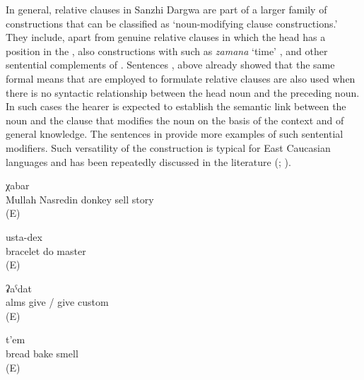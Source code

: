 In general, relative clauses in Sanzhi Dargwa are part of a larger family of constructions that can be classified as `noun-modifying clause constructions.' They include, apart from genuine relative clauses in which the head has a position in the , also constructions with   such as \textit{zamana} `time' ,  and other sentential complements of . Sentences ,  above already showed that the same formal means that are employed to formulate relative clauses are also used when there is no syntactic relationship between the head noun and the preceding noun. In such cases the hearer is expected to establish the semantic link between the noun and the clause that modifies the noun on the basis of the context and of general knowledge. The sentences in  provide more examples of such sentential modifiers. Such versatility of the  construction is typical for East Caucasian languages and has been repeatedly discussed in the literature (\citealp{Daniel.Lander2008, Daniel.Lander2010}; \citealp{Comrie.Forker.Khalilova2017}).

\begin{exe}
	\ex	\label{ex:the story that Mulla Nasredin sold a donkey}
		χabar\\
		Mullah	Nasredin	donkey	sell	story\\
	\glt	{} (E)

	\ex	\label{ex:the mastery of making bracelets}
		usta-dex\\
		bracelet	do	master\\
	\glt	{} (E)

	\ex	\label{ex:the tradition of giving alms}
		ʡaˁdat\\
		alms	give	/	give	custom\\
	\glt	{} (E)

	\ex	\label{ex:the smell of baking bread}
	\gll	[t'ult'	b-uc'-an]	t'em\\
		bread	bake	smell\\
	\glt	{} (E)
\end{exe}

